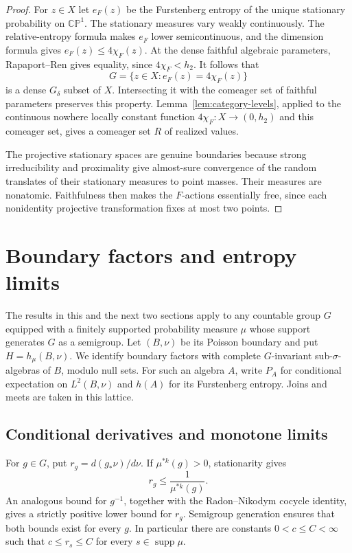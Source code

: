 \documentclass[11pt,letterpaper]{amsart}
\theoremstyle{definition}
\theoremstyle{remark}
\numberwithin{equation}{section}
\begin{document}
\begin{proof}
For $z\in X$ let $e_F(z)$ be the Furstenberg entropy of the unique
stationary probability on $\mathbb{CP}^1$.  The stationary measures
vary weakly continuously.  The relative-entropy formula makes
$e_F$ lower semicontinuous, and the dimension formula gives
$e_F(z)\le4\chi_F(z)$.  At the dense faithful algebraic parameters,
Rapaport--Ren gives equality, since $4\chi_F<h_2$.
It follows that
\[
 G=\{z\in X:e_F(z)=4\chi_F(z)\}
\]
is a dense $G_\delta$ subset of $X$.  Intersecting it with the
comeager set of faithful parameters preserves this property.
Lemma~\ref{lem:category-levels}, applied to the continuous
nowhere locally constant function $4\chi_F:X\to(0,h_2)$ and this
comeager set, gives a comeager set $R$ of realized values.

The projective stationary spaces are genuine boundaries because
strong irreducibility and proximality give almost-sure convergence
of the random translates of their stationary measures to point
masses.  Their measures are nonatomic.  Faithfulness then makes
the $F$-actions essentially free, since each nonidentity projective
transformation fixes at most two points.
\end{proof}

\section{Boundary factors and entropy limits}\label{sec:remaining}

The results in this and the next two sections apply to any countable
group $G$ equipped with a finitely supported probability measure $\mu$
whose support generates $G$ as a semigroup. Let $(B,\nu)$ be its Poisson
boundary and put $H=h_\mu(B,\nu)$. We identify boundary factors with
complete $G$-invariant sub-$\sigma$-algebras of $B$, modulo null sets.
For such an algebra $A$, write $P_A$ for conditional expectation on
$L^2(B,\nu)$ and $h(A)$ for its Furstenberg entropy. Joins and meets
are taken in this lattice.

\subsection{Conditional derivatives and monotone limits}

For $g\in G$, put $r_g=d(g_*\nu)/d\nu$. If
$\mu^{*k}(g)>0$, stationarity gives
\[
 r_g\le \frac{1}{\mu^{*k}(g)}.
\]
An analogous bound for $g^{-1}$, together with the Radon--Nikodym
cocycle identity, gives a strictly positive lower bound for $r_g$.
Semigroup generation ensures that both bounds exist for every $g$.
In particular there are constants $0<c\le C<\infty$ such that
$c\le r_s\le C$ for every $s\in\operatorname{supp}\mu$.
\end{document}

